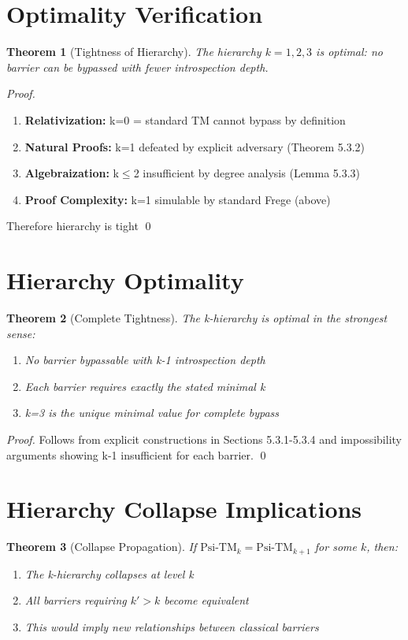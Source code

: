\documentclass[11pt]{article}
\newtheorem{theorem}{Theorem}[section]
\theoremstyle{definition}
\begin{document}
\section{Optimality Verification}

\begin{theorem}[Tightness of Hierarchy]
The hierarchy $k=1,2,3$ is optimal: no barrier can be bypassed with fewer introspection depth.
\end{theorem}

\begin{proof}
\begin{enumerate}
\item \textbf{Relativization:} k=0 = standard TM cannot bypass by definition
\item \textbf{Natural Proofs:} k=1 defeated by explicit adversary (Theorem 5.3.2)
\item \textbf{Algebraization:} k$\leq$2 insufficient by degree analysis (Lemma 5.3.3)
\item \textbf{Proof Complexity:} k=1 simulable by standard Frege (above)
\end{enumerate}
Therefore hierarchy is tight \qed
\end{proof}

\section{Hierarchy Optimality}
\begin{theorem}[Complete Tightness]
The k-hierarchy is optimal in the strongest sense:
\begin{enumerate}
\item No barrier bypassable with k-1 introspection depth
\item Each barrier requires exactly the stated minimal k
\item k=3 is the unique minimal value for complete bypass
\end{enumerate}
\end{theorem}
\begin{proof}
Follows from explicit constructions in Sections 5.3.1-5.3.4 and 
impossibility arguments showing k-1 insufficient for each barrier. \qed
\end{proof}

\section{Hierarchy Collapse Implications}

\begin{theorem}[Collapse Propagation]
If $\text{Psi-TM}_k = \text{Psi-TM}_{k+1}$ for some $k$, then:
\begin{enumerate}
\item The k-hierarchy collapses at level k
\item All barriers requiring $k' > k$ become equivalent
\item This would imply new relationships between classical barriers
\end{enumerate}
\end{theorem}
\end{document}
